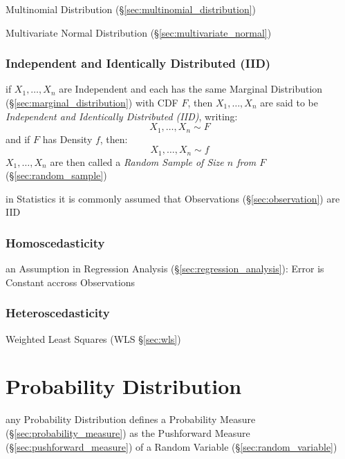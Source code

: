 Multinomial Distribution (\S\ref{sec:multinomial_distribution})

Multivariate Normal Distribution (\S\ref{sec:multivariate_normal})



\subsubsection{Independent and Identically Distributed (IID)}\label{sec:iid}

if $X_1, \ldots, X_n$ are Independent and each has the same Marginal
Distribution (\S\ref{sec:marginal_distribution}) with CDF $F$, then $X_1,
\ldots, X_n$ are said to be \emph{Independent and Identically Distributed
  (IID)}, writing:
\[
  X_1, \ldots, X_n \sim F
\]
and if $F$ has Density $f$, then:
\[
  X_1, \ldots, X_n \sim f
\]
$X_1, \ldots, X_n$ are then called a \emph{Random Sample of Size $n$ from $F$}
(\S\ref{sec:random_sample})

in Statistics it is commonly assumed that Observations (\S\ref{sec:observation})
are IID



\subsubsection{Homoscedasticity}\label{sec:homoscedasticity}

an Assumption in Regression Analysis (\S\ref{sec:regression_analysis}): Error is
Constant accross Observations



\subsubsection{Heteroscedasticity}\label{sec:heteroscedasticity}

Weighted Least Squares (WLS \S\ref{sec:wls})



\section{Probability Distribution}\label{sec:probability_distribution}

any Probability Distribution defines a Probability Measure
(\S\ref{sec:probability_measure}) as the Pushforward Measure
(\S\ref{sec:pushforward_measure}) of a Random Variable
(\S\ref{sec:random_variable})

